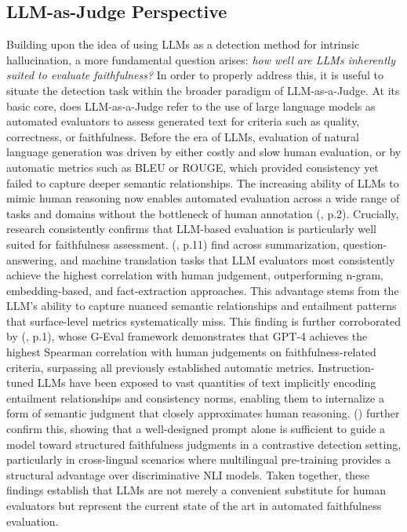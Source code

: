 \documentclass[
  seminar,   	 
  english,   	 
  titlepage=on,
  captions=tableheadings
]{ttlab-qualify}
\begin{document}
\subsection{LLM-as-Judge Perspective}

Building upon the idea of using LLMs as a detection method for intrinsic hallucination, a more fundamental question arises: \textit{how well are LLMs inherently suited to evaluate faithfulness?} In order to properly address this, it is useful to situate the detection task within the broader paradigm of LLM-as-a-Judge. At its basic core, does LLM-as-a-Judge refer to the use of large language models as automated evaluators to assess generated text for criteria such as quality, correctness, or faithfulness. Before the era of LLMs, evaluation of natural language generation was driven by either costly and slow human evaluation, or by automatic metrics such as BLEU or ROUGE, which provided consistency yet failed to capture deeper semantic relationships. The increasing ability of LLMs to mimic human reasoning now enables automated evaluation across a wide range of tasks and domains without the bottleneck of human annotation (\cite{Gu2025LLMJudgeSurvey}, p.2). Crucially, research consistently confirms that LLM-based evaluation is particularly well suited for faithfulness assessment. (\cite{malin2024faithfulness}, p.11) find across summarization, question-answering, and machine translation tasks that LLM evaluators most consistently achieve the highest correlation with human judgement, outperforming n-gram, embedding-based, and fact-extraction approaches. This advantage stems from the LLM's ability to capture nuanced semantic relationships and entailment patterns that surface-level metrics systematically miss. This finding is further corroborated by (\cite{liu2023geval}, p.1), whose G-Eval framework demonstrates that GPT-4 achieves the highest Spearman correlation with human judgements on faithfulness-related criteria, surpassing all previously established automatic metrics. Instruction-tuned LLMs have been exposed to vast quantities of text implicitly encoding entailment relationships and consistency norms, enabling them to internalize a form of semantic judgment that closely approximates human reasoning. (\cite{Gogoulou2025LLMHallucinationDetection}) further confirm this, showing that a well-designed prompt alone is sufficient to guide a model toward structured faithfulness judgments in a contrastive detection setting, particularly in cross-lingual scenarios where multilingual pre-training provides a structural advantage over discriminative NLI models. Taken together, these findings establish that LLMs are not merely a convenient substitute for human evaluators but represent the current state of the art in automated faithfulness evaluation.
\end{document}
